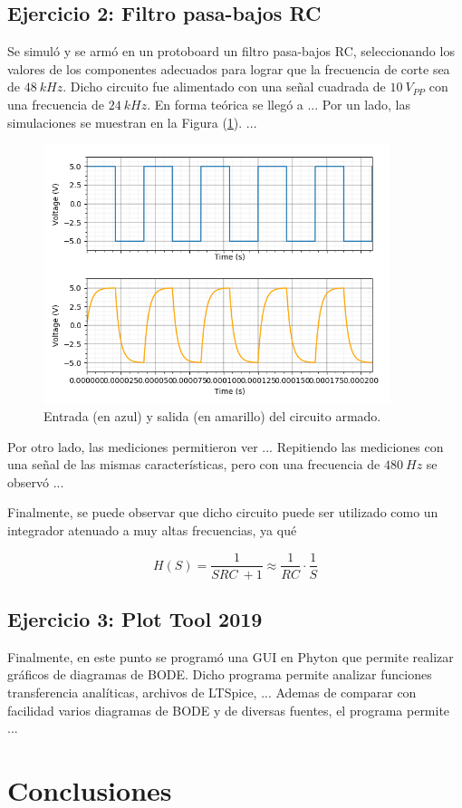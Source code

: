 \documentclass[a4paper]{article}
\begin{document}
\subsection{Ejercicio 2: Filtro pasa-bajos RC}
Se simuló y se armó en un protoboard un filtro pasa-bajos RC, seleccionando los valores de los componentes adecuados para lograr que la frecuencia de corte sea de $ 48 \ kHz $. Dicho circuito fue alimentado con una señal cuadrada de $ 10 \ V_{PP} $ con una frecuencia de $ 24 \ kHz $.
En forma teórica se llegó a ...
Por un lado, las simulaciones se muestran en la Figura (\ref{fig:simu2}). ...

\begin{figure}[H]
	\centering
	\includegraphics[width=0.9\textwidth]{Entrada-Salida.png}
\caption{Entrada (en azul) y salida (en amarillo) del circuito armado.}
	\label{fig:simu2}
\end{figure}

Por otro lado, las mediciones permitieron ver ...
Repitiendo las mediciones con una señal de las mismas características, pero con una frecuencia de $ 480 \ Hz $ se observó ...

Finalmente, se puede observar que dicho circuito puede ser utilizado como un integrador atenuado a muy altas frecuencias, ya qué

\begin{equation}
	H \left(S \right) = \frac{1}{SRC \ + 1} \approx \frac{1}{RC} \cdot \frac{1}{S}
\end{equation}

\subsection{Ejercicio 3: Plot Tool 2019}
Finalmente, en este punto se programó una GUI en Phyton que permite realizar gráficos de diagramas de BODE. Dicho programa permite analizar funciones transferencia analíticas, archivos de LTSpice, ... 
Ademas de comparar con facilidad varios diagramas de BODE y de diversas fuentes, el programa permite ...

\section{Conclusiones}
\end{document}
